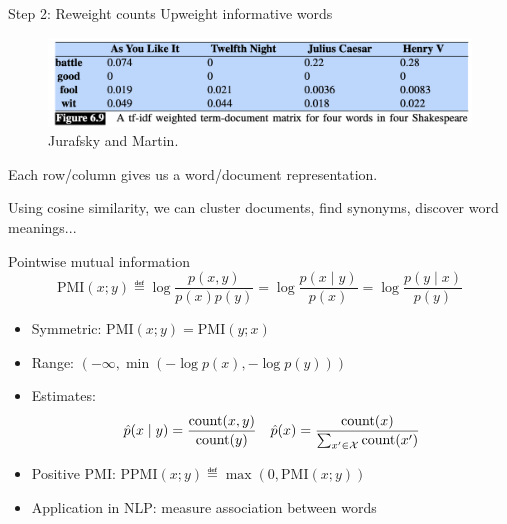 \documentclass[usenames,dvipsnames,notes,11pt,aspectratio=169]{beamer}
\begin{document}
\begin{frame}
    {Step 2: Reweight counts}
    Upweight informative words
    \vspace{-1em}
    \begin{figure}
            \includegraphics[width=\textwidth]{figures/term-doc-tfidf}
                    \caption{Jurafsky and Martin.}
    \end{figure}

    Each row/column gives us a word/document representation.
    
    Using cosine similarity, we can cluster documents, find synonyms, discover word meanings...
\end{frame}

\begin{frame}
    {Pointwise mutual information}
    $$
    \text{PMI}(x;y) \eqdef \log \frac{p(x,y)}{p(x)p(y)}
    = \log\frac{p(x\mid y)}{p(x)}
    = \log\frac{p(y\mid x)}{p(y)}
    $$
    \pause
    \vspace{-1em}
    \begin{itemize}
        \itemsep1em
        \item Symmetric: $\text{PMI}(x;y)=\text{PMI}(y;x)$
        \item Range: $(-\infty, \min(-\log p(x), -\log p(y)))$
        \item Estimates:
            \begin{align*}
            \hat{p}(x\mid y) = \frac{\text{count}(x,y)}{\text{count}(y)}\quad
            \hat{p}(x) = \frac{\text{count}(x)}{\sum_{x'\in\mathcal{X}}\text{count}(x')}
            \end{align*}
        \item Positive PMI: $\text{PPMI}(x;y) \eqdef \max(0, \text{PMI}(x;y))$
        \item Application in NLP: measure association between words 
    \end{itemize}
\end{frame}
\end{document}
